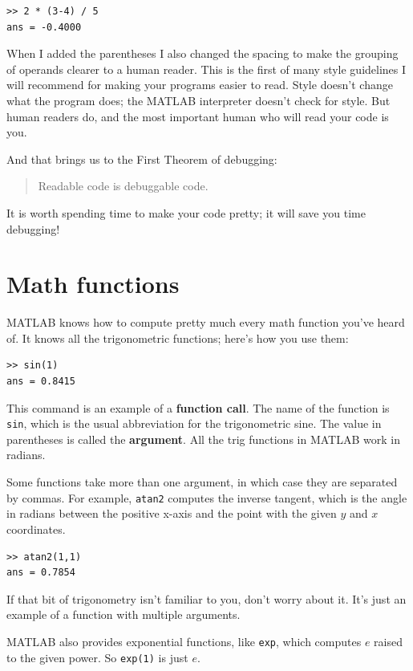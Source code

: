 \documentclass{book}
\begin{document}
\begin{verbatim}
>> 2 * (3-4) / 5
ans = -0.4000
\end{verbatim}

When I added the parentheses I also changed the spacing to make the
grouping of operands clearer to a human reader.  This is the first
of many style guidelines I will recommend for making your programs
easier to read.  Style doesn't change what the program does; the MATLAB
interpreter doesn't check for style.  But human readers do, and the
most important human who will read your code is you.

And that brings us to the First Theorem of debugging:

\begin{quote}
Readable code is debuggable code.
\end{quote}

It is worth spending time to make your code pretty; it will save
you time debugging!


\section{Math functions}

MATLAB knows how to compute pretty much every math function you've
heard of.  It knows all the trigonometric functions; here's how you
use them:

\begin{verbatim}
>> sin(1)
ans = 0.8415
\end{verbatim}

This command is an example of a {\bf function call}.  The name of the
function is {\tt sin}, which is the usual abbreviation for the
trigonometric sine.  The value in parentheses is called the {\bf argument}.
All the trig functions in MATLAB work in radians.

Some functions take more than one argument, in which case they are
separated by commas.  For example, {\tt atan2} computes the inverse
tangent, which is the angle in radians between the positive x-axis and
the point with the given $y$ and $x$ coordinates.

\begin{verbatim}
>> atan2(1,1)
ans = 0.7854
\end{verbatim}

If that bit of trigonometry isn't familiar to you, don't worry about
it.  It's just an example of a function with multiple arguments.

MATLAB also provides exponential functions, like {\tt exp}, which
computes $e$ raised to the given power.  So {\tt exp(1)} is just $e$.
\end{document}
